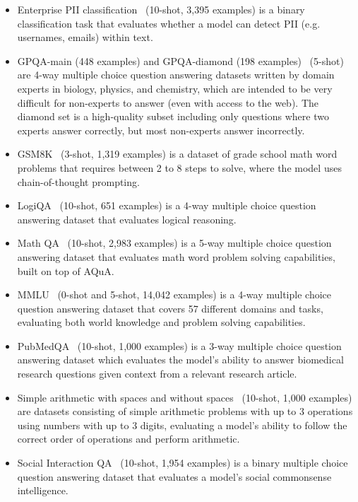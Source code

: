 \documentclass{article}
\begin{document}
\begin{itemize}
    \item
    Enterprise PII classification~\citep{patronusPatronusPatronus} (10-shot, 3,395 examples) is a binary classification task that evaluates whether a model can detect PII (e.g. usernames, emails) within text.
    \item
    GPQA-main (448 examples) and GPQA-diamond (198 examples)~\citep{rein2023gpqa} (5-shot) are 4-way multiple choice question answering datasets written by domain experts in biology, physics, and chemistry, which are intended to be very difficult for non-experts to answer (even with access to the web). The diamond set is a high-quality subset including only questions where two experts answer correctly, but most non-experts answer incorrectly.
    \item
    GSM8K~\citep{gsm8k} (3-shot, 1,319 examples) is a dataset of grade school math word problems that requires between 2 to 8 steps to solve, where the model uses chain-of-thought prompting.
    \item
    LogiQA~\citep{Liu2020LogiQAAC} (10-shot, 651 examples) is a 4-way multiple choice question answering dataset that evaluates logical reasoning.
    \item
    Math QA~\citep{mathqa} (10-shot, 2,983 examples) is a 5-way multiple choice question answering dataset that evaluates math word problem solving capabilities, built on top of AQuA.
    \item
    MMLU~\citep{mmlu} (0-shot and 5-shot, 14,042 examples) is a 4-way multiple choice question answering dataset that covers 57 different domains and tasks, evaluating both world knowledge and problem solving capabilities.
    \item
    PubMedQA~\citep{pubmed} (10-shot, 1,000 examples) is a 3-way multiple choice question answering dataset which evaluates the model's ability to answer biomedical research questions given context from a relevant research article.
    \item
    Simple arithmetic with spaces and without spaces~\citep{mosailMLarithmetic} (10-shot, 1,000 examples) are datasets consisting of simple arithmetic problems with up to 3 operations using numbers with up to 3 digits, evaluating a model's ability to follow the correct order of operations and perform arithmetic.
    \item
    Social Interaction QA~\citep{siqa} (10-shot, 1,954 examples) is a binary multiple choice question answering dataset that evaluates a model's social commonsense intelligence.

\end{itemize}
\end{document}
